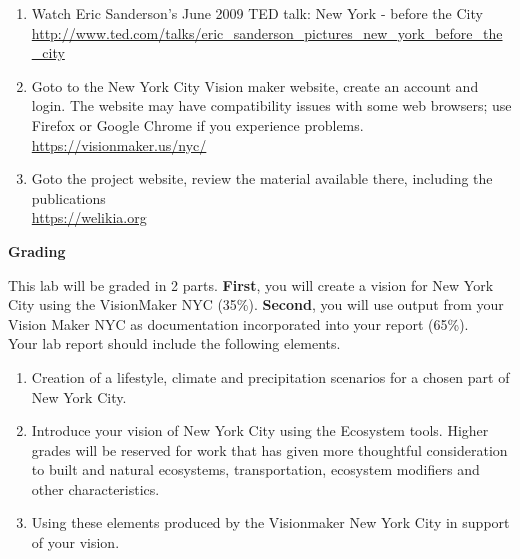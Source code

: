 \documentclass{article}
\begin{document}
\begin{enumerate}[leftmargin=15mm]

\item Watch Eric Sanderson's June 2009 TED talk: New York - before the City \\  
\url{http://www.ted.com/talks/eric_sanderson_pictures_new_york_before_the_city}

\item Goto to the New York City Vision maker website, create an account and login.  The website may have compatibility issues with some web browsers; use Firefox or Google Chrome if you experience problems. \\ 
\url{https://visionmaker.us/nyc/}

\item Goto the project website, review the material available there, including the publications \\ 
\url{https://welikia.org}

\end{enumerate}


\newpage

\textbf{Grading}

\vspace{4mm}

\setlength{\leftskip}{1cm}

\setlength{\parindent}{0cm}

This lab will be graded in 2 parts.  \textbf{First}, you will create a vision for New York City using the VisionMaker NYC (35\%).  \textbf{Second}, you will use output from your Vision Maker NYC as documentation incorporated into your report (65\%). \\

Your lab report should include the following elements.

\begin{enumerate}[leftmargin=15mm]

\item Creation of a lifestyle, climate and precipitation scenarios for a chosen part of New York City.

\item Introduce your vision of New York City using the Ecosystem tools.  Higher grades will be reserved for work that has given more thoughtful consideration to built and natural ecosystems, transportation, ecosystem modifiers and other characteristics.

\item Using these elements produced by the Visionmaker New York City in support of your vision.

\end{enumerate}
\end{document}
